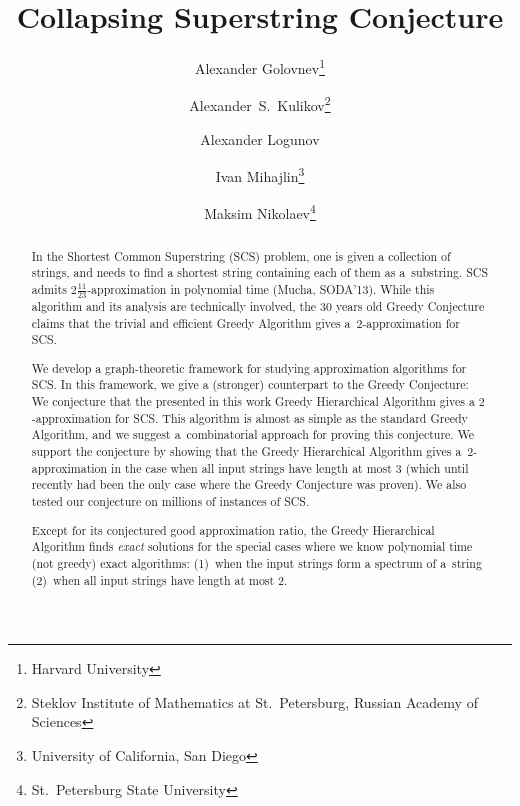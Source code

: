 \documentclass[11pt]{article}
\begin{document}

\sloppy
\begin{titlepage}
\title{Collapsing Superstring Conjecture}
\author{
Alexander Golovnev\thanks{Harvard University}
\and
Alexander~S.~Kulikov\thanks{Steklov Institute of Mathematics at St.~Petersburg, Russian Academy of Sciences}
\and
Alexander Logunov\footnotemark[2]
\and
Ivan Mihajlin\thanks{University of California, San Diego}
\and 
Maksim Nikolaev\thanks{St.~Petersburg State University}
}
\maketitle
\thispagestyle{empty}

\begin{abstract}
In the Shortest Common Superstring (SCS) problem, one is given a collection of strings, and needs to find a shortest string containing each of them as a~substring. SCS admits $2\frac{11}{23}$-approximation in polynomial time (Mucha, SODA'13). While this algorithm and its analysis are technically involved, the $30$ years old Greedy Conjecture claims that the trivial and efficient Greedy Algorithm gives a~$2$-approximation for SCS. %

We develop a graph-theoretic framework for studying approximation algorithms for SCS. In this framework, we give a (stronger) counterpart to the Greedy Conjecture: We conjecture that the presented in this work Greedy Hierarchical Algorithm gives a $2$-approximation for SCS. This algorithm is almost as simple as the standard Greedy Algorithm, and we suggest a~combinatorial approach for proving this conjecture. We support the conjecture by showing that the Greedy Hierarchical Algorithm gives a~$2$-approximation in the case when all input strings have length at most $3$ (which until recently had been the only case where the Greedy Conjecture was proven). We also tested our conjecture on millions of instances of SCS.

Except for its conjectured good approximation ratio, the Greedy Hierarchical Algorithm finds \emph{exact} solutions for the special cases where we know polynomial time (not greedy) exact algorithms: (1)~when the input strings form a spectrum of a~string (2)~when all input strings have length at most $2$.
\end{abstract}
\end{titlepage}

\tableofcontents









\appendix


\end{document}
